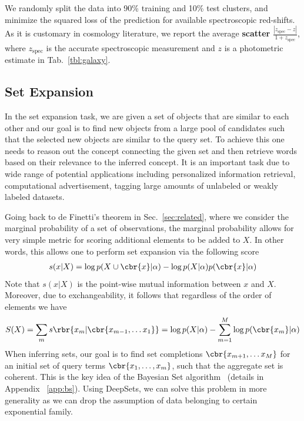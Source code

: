 \documentclass{article}
\newcommand{\refsec}[1]{Sec.~\ref{#1}}
\newcommand{\refapp}[1]{Appendix ~\ref{#1}}
\newcommand{\reftab}[1]{Tab.~\ref{#1}}
\newcommand{\deepsets}{DeepSets\xspace}
\begin{document}
We randomly split the data into 90\% training and 10\% test clusters, and  minimize the squared loss of the prediction for available spectroscopic red-shifts. As it is customary in cosmology literature, we report the average  \textbf{scatter} $\frac{|z_{\mathrm{spec}} - z|}{1 + z_{\mathrm{spec}}}$, where $z_{\mathrm{spec}}$ is the accurate spectroscopic measurement and $z$ is a photometric estimate in \reftab{tbl:galaxy}. 

\subsection{Set Expansion}
In the set expansion task, we are given a set of objects that are similar to each other and our goal is to find new objects from a large pool of candidates such that the selected new objects are similar to the query set. To achieve this one needs to reason out the concept connecting the given set and then retrieve words based on their relevance to the inferred concept. It is an important task due to wide range of potential applications including personalized information retrieval, computational advertisement, tagging large amounts of unlabeled or weakly labeled datasets. 

Going back to de Finetti's theorem in \refsec{sec:related}, where we consider the marginal probability of a set of observations, the marginal probability allows for very simple metric for scoring additional elements to be added to $X$. In other words, this allows one to perform set expansion via the following score
\begin{align}
  \label{eq:score-bayes}
  \vspace{-1mm}
  s(x|X) = \log p(X \cup \cbr{x}|\alpha) - \log p(X|\alpha) p(\cbr{x}|\alpha)
\end{align}
Note that $s(x|X)$ is the point-wise mutual information between $x$ and $X$. Moreover, due to exchangeability, it follows that regardless of the order of elements we have 
\vspace{-3mm}
\begin{align}
  \label{eq:setscore}
  \vspace{-3mm}
  S(X) = \sum_{m} s\rbr{x_m|\cbr{x_{m-1}, \ldots x_1}} = \log p(X|\alpha) - \sum_{m=1}^M \log p(\cbr{x_m}|\alpha)
\end{align}
When inferring sets, our goal is to find set completions $\cbr{x_{m+1}, \ldots x_M}$ for an initial set of query terms $\cbr{x_1, \ldots, x_m}$, such that the aggregate set is coherent. This is the key idea of the Bayesian Set algorithm~\cite{ghahramani2005bayesian} (details in \refapp{app:bs}).
Using \deepsets, we can solve this problem in more generality as we can drop the assumption of data belonging to certain exponential family. 
\end{document}
